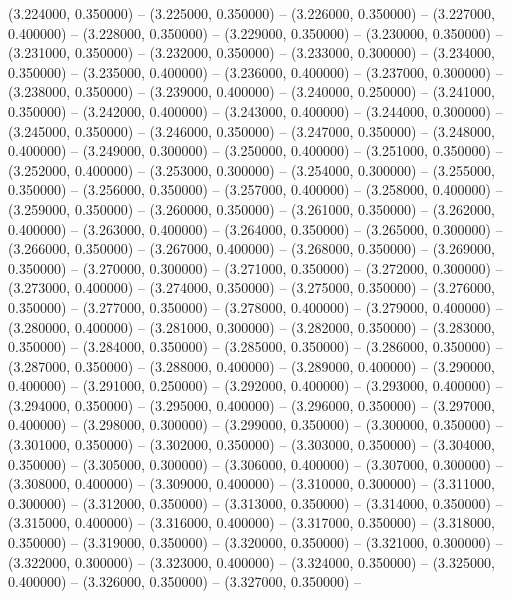 (3.224000, 0.350000) -- 
(3.225000, 0.350000) -- 
(3.226000, 0.350000) -- 
(3.227000, 0.400000) -- 
(3.228000, 0.350000) -- 
(3.229000, 0.350000) -- 
(3.230000, 0.350000) -- 
(3.231000, 0.350000) -- 
(3.232000, 0.350000) -- 
(3.233000, 0.300000) -- 
(3.234000, 0.350000) -- 
(3.235000, 0.400000) -- 
(3.236000, 0.400000) -- 
(3.237000, 0.300000) -- 
(3.238000, 0.350000) -- 
(3.239000, 0.400000) -- 
(3.240000, 0.250000) -- 
(3.241000, 0.350000) -- 
(3.242000, 0.400000) -- 
(3.243000, 0.400000) -- 
(3.244000, 0.300000) -- 
(3.245000, 0.350000) -- 
(3.246000, 0.350000) -- 
(3.247000, 0.350000) -- 
(3.248000, 0.400000) -- 
(3.249000, 0.300000) -- 
(3.250000, 0.400000) -- 
(3.251000, 0.350000) -- 
(3.252000, 0.400000) -- 
(3.253000, 0.300000) -- 
(3.254000, 0.300000) -- 
(3.255000, 0.350000) -- 
(3.256000, 0.350000) -- 
(3.257000, 0.400000) -- 
(3.258000, 0.400000) -- 
(3.259000, 0.350000) -- 
(3.260000, 0.350000) -- 
(3.261000, 0.350000) -- 
(3.262000, 0.400000) -- 
(3.263000, 0.400000) -- 
(3.264000, 0.350000) -- 
(3.265000, 0.300000) -- 
(3.266000, 0.350000) -- 
(3.267000, 0.400000) -- 
(3.268000, 0.350000) -- 
(3.269000, 0.350000) -- 
(3.270000, 0.300000) -- 
(3.271000, 0.350000) -- 
(3.272000, 0.300000) -- 
(3.273000, 0.400000) -- 
(3.274000, 0.350000) -- 
(3.275000, 0.350000) -- 
(3.276000, 0.350000) -- 
(3.277000, 0.350000) -- 
(3.278000, 0.400000) -- 
(3.279000, 0.400000) -- 
(3.280000, 0.400000) -- 
(3.281000, 0.300000) -- 
(3.282000, 0.350000) -- 
(3.283000, 0.350000) -- 
(3.284000, 0.350000) -- 
(3.285000, 0.350000) -- 
(3.286000, 0.350000) -- 
(3.287000, 0.350000) -- 
(3.288000, 0.400000) -- 
(3.289000, 0.400000) -- 
(3.290000, 0.400000) -- 
(3.291000, 0.250000) -- 
(3.292000, 0.400000) -- 
(3.293000, 0.400000) -- 
(3.294000, 0.350000) -- 
(3.295000, 0.400000) -- 
(3.296000, 0.350000) -- 
(3.297000, 0.400000) -- 
(3.298000, 0.300000) -- 
(3.299000, 0.350000) -- 
(3.300000, 0.350000) -- 
(3.301000, 0.350000) -- 
(3.302000, 0.350000) -- 
(3.303000, 0.350000) -- 
(3.304000, 0.350000) -- 
(3.305000, 0.300000) -- 
(3.306000, 0.400000) -- 
(3.307000, 0.300000) -- 
(3.308000, 0.400000) -- 
(3.309000, 0.400000) -- 
(3.310000, 0.300000) -- 
(3.311000, 0.300000) -- 
(3.312000, 0.350000) -- 
(3.313000, 0.350000) -- 
(3.314000, 0.350000) -- 
(3.315000, 0.400000) -- 
(3.316000, 0.400000) -- 
(3.317000, 0.350000) -- 
(3.318000, 0.350000) -- 
(3.319000, 0.350000) -- 
(3.320000, 0.350000) -- 
(3.321000, 0.300000) -- 
(3.322000, 0.300000) -- 
(3.323000, 0.400000) -- 
(3.324000, 0.350000) -- 
(3.325000, 0.400000) -- 
(3.326000, 0.350000) -- 
(3.327000, 0.350000) -- 
